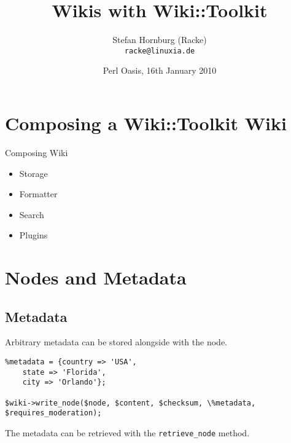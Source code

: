 \usepackage{beamerthemesplit}
\usepackage{verbatim}
\usepackage{hyperref}
\usepackage{listings}
\lstset{language=Perl}

\title{Wikis with Wiki::Toolkit}
\author[racke]{Stefan Hornburg (Racke)\\ \texttt{racke@linuxia.de}}
\date[OPW2010]{Perl Oasis, 16th January 2010}



\begin{frame}
  \titlepage
\end{frame}

\section[Outline]{}
\frame{\tableofcontents}

\section{Composing a Wiki::Toolkit Wiki}

\begin{frame}{Composing Wiki}
 \begin{itemize}
  \item<1-> Storage
  \item<2-> Formatter
  \item<3-> Search
  \item<4-> Plugins
 \end{itemize}
\end{frame}

\section{Nodes and Metadata}

\subsection{Metadata}

Arbitrary metadata can be stored alongside with the node.

\begin{lstlisting}
%metadata = {country => 'USA', 
    state => 'Florida',
    city => 'Orlando'};

$wiki->write_node($node, $content, $checksum, \%metadata, $requires_moderation);
\end{lstlisting}

The metadata can be retrieved with the \verb+retrieve_node+ method.

